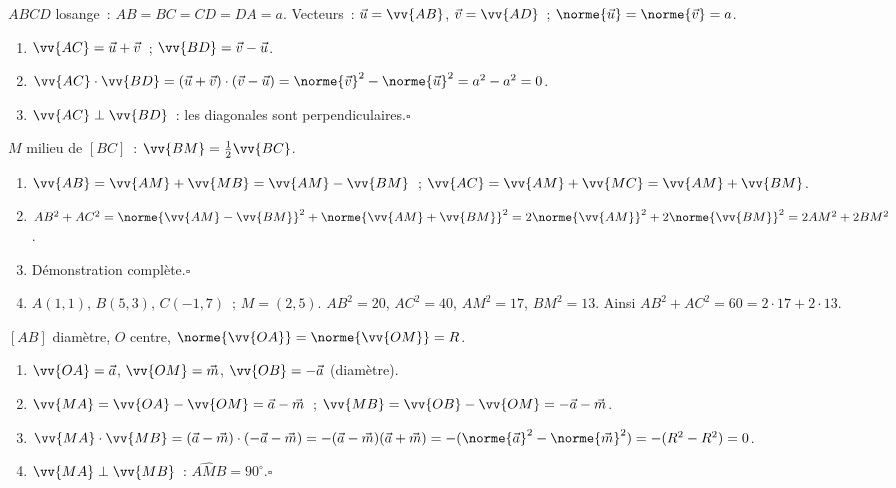
$ABCD$ losange~: $AB=BC=CD=DA=a$. Vecteurs~: $\vec{u}=\vv{AB}$, $\vec{v}=\vv{AD}$~;
$\norme{\vec{u}}=\norme{\vec{v}}=a$.
\begin{enumerate}
  \item $\vv{AC}=\vec{u}+\vec{v}$~; $\vv{BD}=\vec{v}-\vec{u}$.
  \item $\vv{AC}\cdot\vv{BD}=(\vec{u}+\vec{v})\cdot(\vec{v}-\vec{u})
        =\norme{\vec{v}}^2-\norme{\vec{u}}^2=a^2-a^2=0$.
  \item $\vv{AC}\perp\vv{BD}$~: les diagonales sont perpendiculaires.\hfill$\square$
\end{enumerate}


$M$ milieu de $[BC]$~: $\vv{BM}=\frac{1}{2}\vv{BC}$.
\begin{enumerate}
  \item $\vv{AB}=\vv{AM}+\vv{MB}=\vv{AM}-\vv{BM}$~;
        $\vv{AC}=\vv{AM}+\vv{MC}=\vv{AM}+\vv{BM}$.
  \item $AB^2+AC^2=\norme{\vv{AM}-\vv{BM}}^2+\norme{\vv{AM}+\vv{BM}}^2
        =2\norme{\vv{AM}}^2+2\norme{\vv{BM}}^2=2AM^2+2BM^2$.
  \item D\'emonstration compl\`ete.\hfill$\square$
  \item $A(1,1)$, $B(5,3)$, $C(-1,7)$~; $M=(2,5)$.
        $AB^2=20$, $AC^2=40$, $AM^2=17$, $BM^2=13$.
        Ainsi $AB^2+AC^2=60=2\cdot17+2\cdot13$.\checkmark
\end{enumerate}


$[AB]$ diam\`etre, $O$ centre, $\norme{\vv{OA}}=\norme{\vv{OM}}=R$.
\begin{enumerate}
  \item $\vv{OA}=\vec{a}$, $\vv{OM}=\vec{m}$, $\vv{OB}=-\vec{a}$ (diam\`etre).
  \item $\vv{MA}=\vv{OA}-\vv{OM}=\vec{a}-\vec{m}$~;
        $\vv{MB}=\vv{OB}-\vv{OM}=-\vec{a}-\vec{m}$.
  \item $\vv{MA}\cdot\vv{MB}=(\vec{a}-\vec{m})\cdot(-\vec{a}-\vec{m})
        =-(\vec{a}-\vec{m})(\vec{a}+\vec{m})
        =-(\norme{\vec{a}}^2-\norme{\vec{m}}^2)=-(R^2-R^2)=0$.
  \item $\vv{MA}\perp\vv{MB}$~: $\widehat{AMB}=90^{\circ}$.\hfill$\square$
\end{enumerate}

